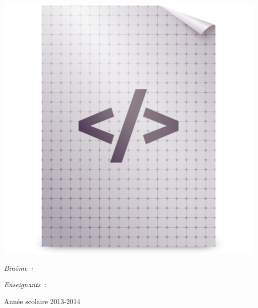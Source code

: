 \begin{center}
	\includegraphics [scale=0.35]{images/application-xml.png} \\[0.7cm]
	\begin{minipage}[t]{0.4\textwidth}
	  \begin{flushleft} \large
	    \emph{Binôme~:}\\
	    \small \reportauthor
	  \end{flushleft}
	\end{minipage}
	\begin{minipage}[t]{0.5\textwidth}
	  \begin{flushright} \large
	    \emph{Enseignants~:} \\
	    \enseignants
	  \end{flushright}
	\end{minipage}

	\vfill
	\footnotesize{Année scolaire 2013-2014}
\end{center}
